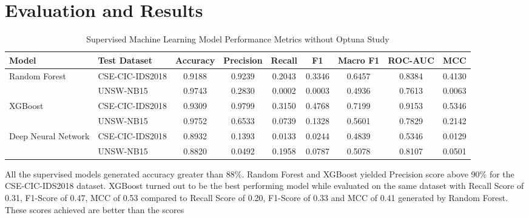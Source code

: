 \chapter{Evaluation and Results}

\begin{table}[htbp]
    \centering
    \caption{Supervised Machine Learning Model Performance Metrics without Optuna Study}
    \label{tab:model_performance_supervised}
    \scriptsize
    \setlength{\tabcolsep}{3pt}

    \begin{tabular}{llccccccc}
        \toprule
        \textbf{Model} & \textbf{Test Dataset} &
        \textbf{Accuracy} & \textbf{Precision} & \textbf{Recall} &
        \textbf{F1} & \textbf{Macro F1} & \textbf{ROC-AUC} & \textbf{MCC} \\
        \midrule

        \multirow[c]{2}{*}{Random Forest}
        & CSE-CIC-IDS2018 & 0.9188 & 0.9239 & 0.2043 & 0.3346 & 0.6457 & 0.8384 & 0.4130 \\
        & UNSW-NB15       & 0.9743 & 0.2830 & 0.0002 & 0.0003 & 0.4936 & 0.7613 & 0.0063 \\

        \midrule

        \multirow[c]{2}{*}{XGBoost}
        & CSE-CIC-IDS2018 & 0.9309 & 0.9799 & 0.3150 & 0.4768 & 0.7199 & 0.9153 & 0.5346 \\
        & UNSW-NB15       & 0.9752 & 0.6533 & 0.0739 & 0.1328 & 0.5601 & 0.7829 & 0.2142 \\

        \midrule

        \multirow[c]{2}{*}{Deep Neural Network}
        & CSE-CIC-IDS2018 & 0.8932 & 0.1393 & 0.0133 & 0.0244 & 0.4839 & 0.5346 & 0.0129 \\
        & UNSW-NB15       & 0.8820 & 0.0492 & 0.1958 & 0.0787 & 0.5078 & 0.8107 & 0.0501 \\

        \bottomrule
    \end{tabular}
\end{table}
All the supervised models generated accuracy greater than 88\%. Random Forest and XGBoost yielded Precision score above 90\% for the 
CSE-CIC-IDS2018 dataset. XGBoost turned out to be the best performing model while evaluated on the same dataset with Recall Score of 0.31, F1-Score of 0.47, 
MCC of 0.53 compared to Recall Score of 0.20, F1-Score of 0.33 and MCC of 0.41 generated by Random Forest. These scores achieved are better than the scores 
